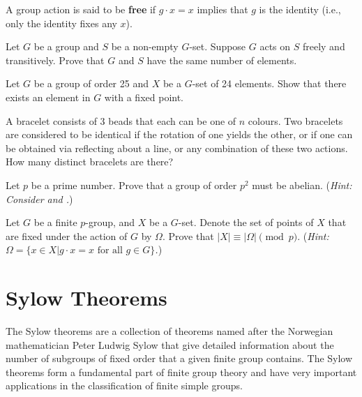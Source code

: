 \begin{problem}
    A group action is said to be \textbf{free} if $g\cdot x = x$ implies that $g$ is the identity (i.e., only the identity fixes any $x$).
    
    Let $G$ be a group and $S$ be a non-empty $G$-set. Suppose $G$ acts on $S$ freely and transitively. Prove that $G$ and $S$ have the same number of elements.
\end{problem}

\begin{problem}
    Let $G$ be a group of order 25 and $X$ be a $G$-set of 24 elements. Show that there exists an element in $G$ with a fixed point.
\end{problem}

\begin{problem}
    A bracelet consists of 3 beads that each can be one of $n$ colours. Two bracelets are considered to be identical if the rotation of one yields the other, or if one can be obtained via reflecting about a line, or any combination of these two actions. How many distinct bracelets are there?
\end{problem}

\begin{problem}\label{problem-group-of-order-prime-squared-is-abelian}
    Let $p$ be a prime number. Prove that a group of order $p^2$ must be abelian.\newline
    (\textit{Hint: Consider  and .})
\end{problem}

\newpage

\begin{problem}
    Let $G$ be a finite $p$-group, and $X$ be a $G$-set. Denote the set of points of $X$ that are fixed under the action of $G$ by $\Omega$. Prove that $|X| \equiv |\Omega| \pmod p$.\newline
    (\textit{Hint: $\Omega = \{x \in X \vert g\cdot x = x \textrm{ for all } g \in G\}$.})
\end{problem}

\chapter{Sylow Theorems}
The Sylow theorems are a collection of theorems named after the Norwegian mathematician Peter Ludwig Sylow that give detailed information about the number of subgroups of fixed order that a given finite group contains. The Sylow theorems form a fundamental part of finite group theory and have very important applications in the classification of finite simple groups.

